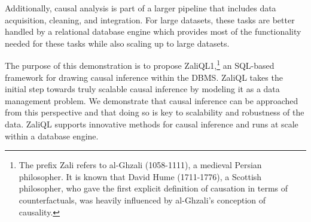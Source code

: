 Additionally, causal analysis is part of a larger pipeline that includes data acquisition, cleaning, and integration. For large datasets, these tasks are better handled by a relational database engine which provides most of the functionality needed for these tasks while also scaling up to large datasets. 

The purpose of this demonstration is to propose ZaliQL1,\footnote{ The prefix Zali refers to
  al-Ghzali (1058-1111), a medieval Persian philosopher. It is known
  that David Hume (1711-1776), a Scottish philosopher, who gave the
  first explicit definition of causation in terms of counterfactuals,
  was heavily influenced by al-Ghzali's conception of causality.} an SQL-based framework for drawing causal inference within the DBMS. ZaliQL takes the initial step towards truly scalable causal inference by modeling it as a data management problem. We demonstrate that causal inference can be approached from this perspective and that doing so is key to scalability and robustness of the data. ZaliQL supports innovative methods for causal inference and runs at scale within a database engine. 



